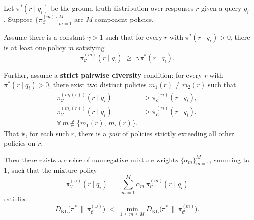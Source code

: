 \begin{theorem}
\label{thm:ensemble-improvement-strict}
Let $\pi^*(r \mid q_i)$ be the ground-truth distribution over responses $r$ given a query $q_i$.  Suppose $\{\pi_{\mathcal{C}}^{(m)}\}_{m=1}^M$ are $M$ component policies.  

Assume there is a constant $\gamma>1$ such that for every $r$ with $\pi^*(r\mid q_i)>0$, there is at least one policy $m$ satisfying
\begin{equation}
   \pi_{\mathcal{C}}^{(m)}(r\mid q_i)\;\ge\;\gamma \,\pi^*(r\mid q_i).
\end{equation}

Further, assume a \textbf{strict pairwise diversity} condition: for every $r$ with $\pi^*(r\mid q_i)>0$, there exist two distinct policies $m_1(r) \neq m_2(r)$ such that 
\begin{align*}
    \pi_{\mathcal{C}}^{(m_1(r))}(r \mid q_i) &> \pi_{\mathcal{C}}^{(m)}(r \mid q_i), \\
    \pi_{\mathcal{C}}^{(m_2(r))}(r \mid q_i) &> \pi_{\mathcal{C}}^{(m)}(r \mid q_i) , \\ \forall\, m \notin \{ m_1(r),\, m_2(r) \}.
\end{align*}
That is, for each such $r$, there is a \emph{pair} of policies strictly exceeding all other policies on $r.$

Then there exists a choice of nonnegative mixture weights $\{\alpha_m\}_{m=1}^M$, summing to 1, such that the mixture policy 
\[
   \pi_{\mathcal{C}}^{(\cup)}(r\mid q_i) \;=\; \sum_{m=1}^M \alpha_m\,\pi_{\mathcal{C}}^{(m)}(r\mid q_i)
\]
satisfies
\[
   D_{\mathrm{KL}}\!\bigl(\pi^*\,\big\|\,\pi_{\mathcal{C}}^{(\cup)}\bigr) \;<\;
   \min_{1\le m\le M} D_{\mathrm{KL}}\!\bigl(\pi^*\,\big\|\,\pi_{\mathcal{C}}^{(m)}\bigr).
\]
\end{theorem}

